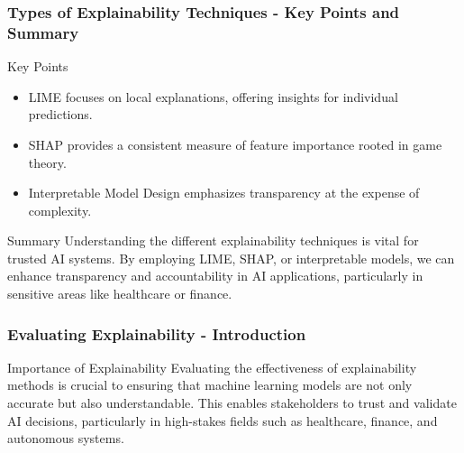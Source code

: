 \documentclass[aspectratio=169]{beamer}
\begin{document}
\begin{frame}[fragile]
  \frametitle{Types of Explainability Techniques - Key Points and Summary}
  \begin{block}{Key Points}
    \begin{itemize}
      \item LIME focuses on local explanations, offering insights for individual predictions.
      \item SHAP provides a consistent measure of feature importance rooted in game theory.
      \item Interpretable Model Design emphasizes transparency at the expense of complexity.
    \end{itemize}
  \end{block}

  \begin{block}{Summary}
    Understanding the different explainability techniques is vital for trusted AI systems. 
    By employing LIME, SHAP, or interpretable models, we can enhance transparency and accountability in AI applications, particularly in sensitive areas like healthcare or finance.
  \end{block}
\end{frame}

\begin{frame}[fragile]
  \frametitle{Evaluating Explainability - Introduction}
  \begin{block}{Importance of Explainability}
    Evaluating the effectiveness of explainability methods is crucial to ensuring that machine learning models are not only accurate but also understandable. This enables stakeholders to trust and validate AI decisions, particularly in high-stakes fields such as healthcare, finance, and autonomous systems.
  \end{block}
\end{frame}
\end{document}
